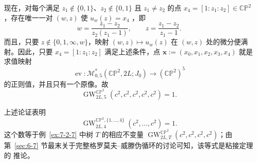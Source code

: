 \begin{example}
现在，对每个满足
$z_1\notin\{0,1\}$、$z_2\notin\{0,1\}$ 且 $z_1\ne z_2$ 的点
$x_4=[1:z_1:z_2]\in\mathbb{CP}^2$，存在唯一一对 $(w,z)$ 使 $u_w(z)=x_4$
，即
\[
  w=\frac{z_1-z_2}{z_2(z_1-1)},
  \qquad
  z=\frac{z_1-z_2}{z_1-1}.
\]
而且，只要 $z\notin\{0,1,\infty,w\}$，映射
$(w,z)\mapsto u_w(z)$ 在 $(w,z)$ 处的微分便满射。因此，只要
$x_4=[1:z_1:z_2]$ 满足上述条件，点
$\mathbf x:=(x_0,x_1,x_2,x_3,x_4)$ 就是求值映射
\[
  \operatorname{ev}:\mathcal M^*_{0,5}(\mathbb{CP}^2,2L;J_0)
  \longrightarrow(\mathbb{CP}^2)^5
\]
的正则值，并且只有一个原像。故
\[
  \operatorname{GW}^{\mathbb{CP}^2}_{2L,5}(c^2,c^2,c^2,c^2,c^2)=1.
\]
\end{example}

\begin{remark}\label{rem:7-2-10}
上述论证表明
\[
  \operatorname{GW}^{\mathbb{CP}^2,\{1,\ldots,4\}}_{2L,4}
  (c^2,\ldots,c^2)=1.
\]
这个数等于例~\ref{ex:7-2-7} 中树 $T$ 的相应不变量
$\operatorname{GW}^{\mathbb{CP}^2}_{2L,T}(c^2,c^2,c^2,c^2)$；由
第~\ref{sec:6-7} 节最末关于完整格罗莫夫--威滕伪循环的讨论可知，该等式是粘接定理的
推论。
\end{remark}
